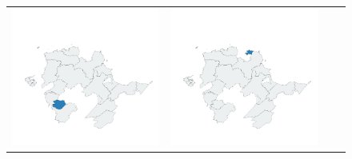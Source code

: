 \begin{figure}[p]
\begin{tabularx}{1\textwidth}{XXXX}
\includegraphics[width=1\linewidth]{images/ch6/loading/13}&
\includegraphics[width=1\linewidth]{images/ch6/loading/14}&

\end{tabularx}
\end{figure}
